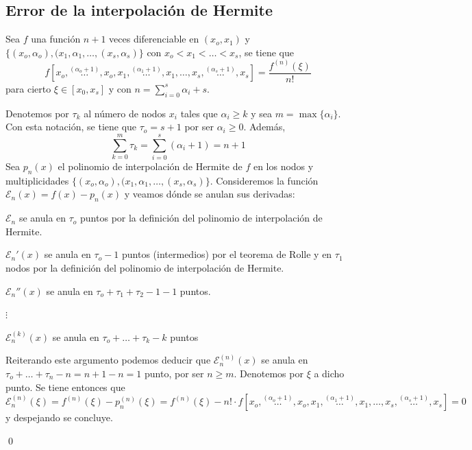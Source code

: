       \subsection{Error de la interpolación de Hermite}
      \begin{lem}
      Sea $f$ una función $n+1$ veces diferenciable en $(x_o,x_1)$ y $\{(x_o,\alpha_o),(x_1,\alpha_1,\ldots,(x_s,\alpha_s)\}$ con $x_o<x_1<\ldots<x_s$, se tiene que
      $$f[x_o,\overset{(\alpha_o+1)}{\ldots},x_o,x_1,\overset{(\alpha_1+1)}{\ldots},x_1,\ldots,x_s,\overset{(\alpha_s+1)}{\ldots},x_s]=\frac{f^{(n)}(\xi)}{n!}$$
      para cierto $\xi\in[x_0,x_s]$  y con $n=\sum_{i=0}^s\alpha_i+s$.
      \end{lem}
      \begin{dem}
        Denotemos por $\tau_k$ al número de nodos $x_i$ tales que $\alpha_i\geq k$ y sea \newline $m=\max\{\alpha_i\}$. Con esta notación, se tiene que $\tau_o=s+1$ por ser $\alpha_i\geq 0$. Además,
        $$\sum_{k=0}^m\tau_k=\sum_{i=0}^s(\alpha_i+1)=n+1$$
        Sea $p_n(x)$ el polinomio de interpolación de Hermite de $f$ en los nodos y multiplicidades  $\{(x_o,\alpha_o),(x_1,\alpha_1,\ldots,(x_s,\alpha_s)\}$. Consideremos la función $\mathcal{E}_n(x)=f(x)-p_n(x)$ y veamos dónde se anulan sus derivadas:

        \item[0)] $\mathcal{E}_n$ se anula en $\tau_o$ puntos por la definición del polinomio de interpolación de Hermite.
        \item[1)]$\mathcal{E}_n'(x)$ se anula en $\tau_o-1$ puntos (intermedios) por el teorema de Rolle y en $\tau_1$ nodos por la definición del polinomio de interpolación de Hermite.
        \item[2)]$\mathcal{E}_n''(x)$ se anula en $\tau_o+\tau_1+\tau_2-1-1$ puntos.
        
        $\vdots$
        
        \item[k)]$\mathcal{E}_n^{(k)}(x)$ se anula en $\tau_o+\ldots+\tau_k-k$ puntos

        Reiterando este argumento podemos deducir que $\mathcal{E}_n^{(n)}(x)$ se anula en  $\tau_o+\ldots+\tau_n-n=n+1-n=1$ punto, por ser $n\geq m$. Denotemos por $\xi$ a dicho punto. Se tiene entonces que
        $$\mathcal{E}_n^{(n)}(\xi)=f^{(n)}(\xi)-p_n^{(n)}(\xi)=f^{(n)}(\xi)-n!\cdot f[x_o,\overset{(\alpha_o+1)}{\ldots},x_o,x_1,\overset{(\alpha_1+1)}{\ldots},x_1,\ldots,x_s,\overset{(\alpha_s+1)}{\ldots},x_s]=0 $$
        y despejando se concluye.
        
      \qed\end{dem}
